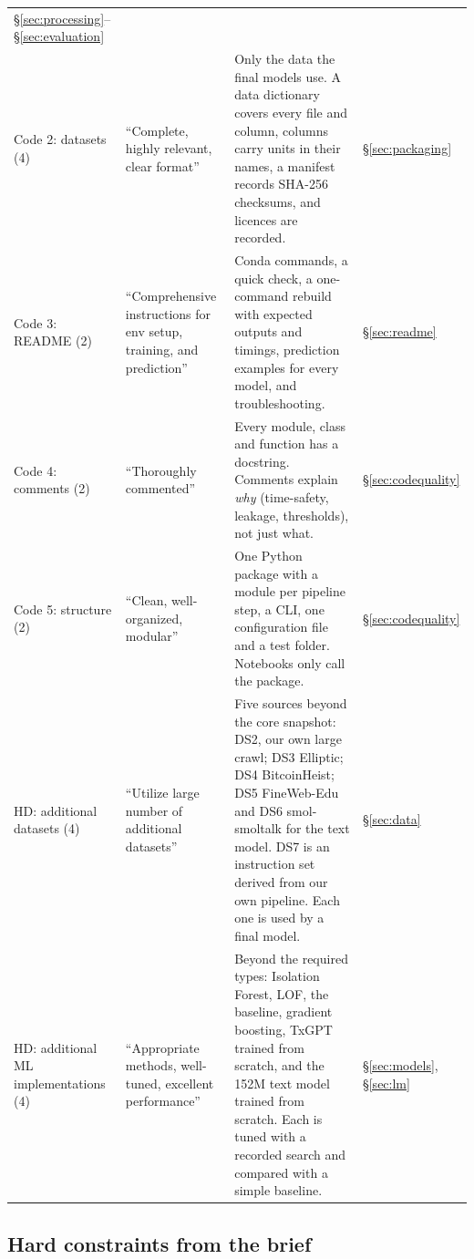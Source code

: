 \begin{longtable}{@{}L{3.0cm}L{3.3cm}L{6.0cm}L{2.6cm}@{}}
\S\ref{sec:processing}--\S\ref{sec:evaluation} \\
Code 2: datasets (4) & ``Complete, highly relevant, clear format'' &
Only the data the final models use. A data dictionary covers every file and column, columns
carry units in their names, a manifest records SHA-256 checksums, and licences are recorded. &
\S\ref{sec:packaging} \\
Code 3: README (2) & ``Comprehensive instructions for env setup, training, and prediction'' &
Conda commands, a quick check, a one-command rebuild with expected outputs and timings,
prediction examples for every model, and troubleshooting. &
\S\ref{sec:readme} \\
Code 4: comments (2) & ``Thoroughly commented'' &
Every module, class and function has a docstring. Comments explain \emph{why} (time-safety,
leakage, thresholds), not just what. &
\S\ref{sec:codequality} \\
Code 5: structure (2) & ``Clean, well-organized, modular'' &
One Python package with a module per pipeline step, a CLI, one configuration file and a test
folder. Notebooks only call the package. &
\S\ref{sec:codequality} \\
\midrule
HD: additional datasets (4) & ``Utilize large number of additional datasets'' &
Five sources beyond the core snapshot: DS2, our own large crawl; DS3 Elliptic; DS4 BitcoinHeist;
DS5 FineWeb-Edu and DS6 smol-smoltalk for the text model. DS7 is an instruction set derived from
our own pipeline. Each one is used by a final model. &
\S\ref{sec:data} \\
HD: additional ML implementations (4) & ``Appropriate methods, well-tuned, excellent performance'' &
Beyond the required types: Isolation Forest, LOF, the baseline, gradient boosting, TxGPT trained
from scratch, and the 152M text model trained from scratch. Each is tuned with a recorded search
and compared with a simple baseline. &
\S\ref{sec:models}, \S\ref{sec:lm} \\
\bottomrule
\end{longtable}

\subsection{Hard constraints from the brief}

